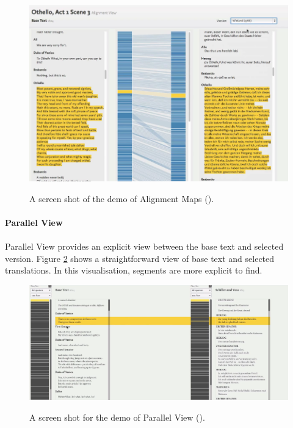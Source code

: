 \begin{figure}[H] 
	\centering    
	\includegraphics[scale=0.7]{Figs/Alignment-Map}\\[1ex]
	\caption{A screen shot of the demo of Alignment Maps (\cite{Cheesman2012}).}
	\label{fig:alignmentMap}
\end{figure} 

\paragraph{Parallel View}
\paragraph[]{}

Parallel View provides an explicit view between the base text and selected version. Figure \ref{fig:parallelView} shows a straightforward view of base text and selected translations. In this visualisation, segments are more explicit to find.

\begin{figure}[H] 
	\centering    
	\includegraphics[scale=0.6]{Figs/Parallel-View}\\[1ex]
	\caption{A screen shot for the demo of Parallel View (\cite{Cheesman2012}).}
	\label{fig:parallelView}
\end{figure} 


